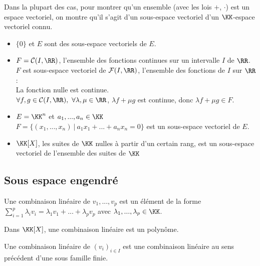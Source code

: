 \documentclass[../main.tex]{subfile}
\begin{document}
\begin{rema}
	Dans la plupart des cas, pour montrer qu'un ensemble (avec les lois $+$, $\cdot$) est un espace vectoriel, on montre qu'il s'agit d'un sous-espace vectoriel d'un $\KK$-espace vectoriel connu.
\end{rema}

\begin{ex}
\begin{itemize}	
	\item $\{0\}$ et $E$ sont des sous-espace vectoriels de $E$.
	\item $F = \mathcal{C}(I, \RR)$, l'ensemble des fonctions continues sur un intervalle $I$ de $\RR$.\\
	$F$ est sous-espace vectoriel de $\mathcal{F}(I, \RR)$, l'ensemble des fonctions de $I$ sur $\RR$:\\
	La fonction nulle est continue.\\
	$\forall f, g \in \mathcal{C}(I, \RR), \ \forall \lambda, \mu \in \RR$, $\lambda f + \mu g$ est continue, donc $\lambda f + \mu g \in F$.
	\item $E = \KK^n$ et $a_1, ..., a_n \in \KK$\\
	$F = \{(x_1, ..., x_n) \ | \ a_1x_1 + ... + a_nx_n = 0\}$ est un sous-espace vectoriel de $E$.
	\item $\KK[X]$, les suites de $\KK$ nulles à partir d'un certain rang, est un sous-espace vectoriel de l'ensemble des suites de $\KK$
\end{itemize}
\end{ex}

\subsection{Sous espace engendré}
\begin{defi}
	Une combinaison linéaire de $v_1, ..., v_p$ est un élément de la forme $\sum\limits_{i=1}^p \lambda_i v_i = \lambda_1 v_1 + ... + \lambda_p v_p$ avec $\lambda_1, ..., \lambda_p \in \KK$.\\
\end{defi}

\begin{ex}
	Dans $\KK[X]$, une combinaison linéaire est un polynôme.
\end{ex}

\begin{rema}
	Une combinaison linéaire de $(v_i)_{i \in I}$ est une combinaison linéaire au sens précédent d'une sous famille finie.
\end{rema}
\end{document}
